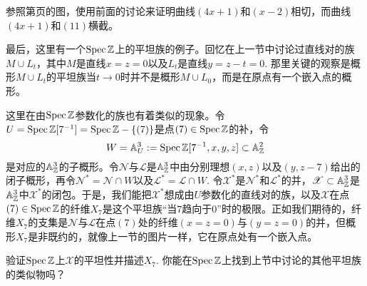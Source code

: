\begin{exe}\label{exe:2.44}
参照第\pageref{p:2.18}页的图，使用前面的讨论来证明曲线$(4x + 1)$和$(x-2)$相切，而曲线$(4x + 1)$和$(11)$横截。
\end{exe}

最后，这里有一个$\operatorname{Spec} \mathbb{Z}$上的平坦族的例子。回忆在上一节中讨论过直线对的族$M\cup L_t$，其中$M$是直线$x=z=0$以及$L_t$是直线$y=z-t=0$. 那里关键的观察是概形$M\cup L_t$的平坦族当$t\to 0$时并不是概形$M\cup L_0$，而是在原点有一个嵌入点的概形。

这里在由$\operatorname{Spec} \mathbb{Z}$参数化的族也有着类似的现象。令$U=\operatorname{Spec} \mathbb{Z}[7^{-1}]=\operatorname{Spec} \mathbb{Z}-\{(7)\}$是点$(7)\in\operatorname{Spec}\mathbb{Z}$的补，令
\[
	W=\mathbb{A}_U^3:=\operatorname{Spec} \mathbb{Z}[7^{-1},x,y,z]\subset \mathbb{A}_{\mathbb{Z}}^2
\]
是对应的$\mathbb{A}_{\mathbb{Z}}^3$的子概形。令$\mathscr{N}$与$\mathscr{L}$是$\mathbb{A}_{\mathbb{Z}}^3$中由分别理想$(x,z)$以及$(y,z-7)$给出的闭子概形，再令$\mathscr{N}^*=\mathscr{N}\cap W$以及$\mathscr{L}^*=\mathscr{L}\cap W$. 令$\mathscr{X}^*$是$\mathscr{N}^*$和$\mathscr{L}^*$的并，$\mathscr{X}\subset \mathbb{A}_{\mathbb{Z}}^3$是$\mathbb{A}_{\mathbb{Z}}^3$中$\mathscr{X}^*$的闭包。于是，我们能把$\mathscr{X}^*$想成由$U$参数化的直线对的族，以及$\mathscr{X}$在点$(7)\in\operatorname{Spec} \mathbb{Z}$的纤维$X_7$是这个平坦族“当$7$趋向于$0$”时的极限。正如我们期待的，纤维$X_7$的支集是$\mathscr{N}$与$\mathscr{L}$在点$(7)$处的纤维$(x=z=0)$与$(y=z=0)$的并，但概形$X_7$是非既约的，就像上一节的图片一样，它在原点处有一个嵌入点。

\begin{exe}
验证$\operatorname{Spec}\mathbb{Z}$上$\mathscr{X}$的平坦性并描述$X_7$. 你能在$\operatorname{Spec}\mathbb{Z}$上找到上节中讨论的其他平坦族的类似物吗？
\end{exe}